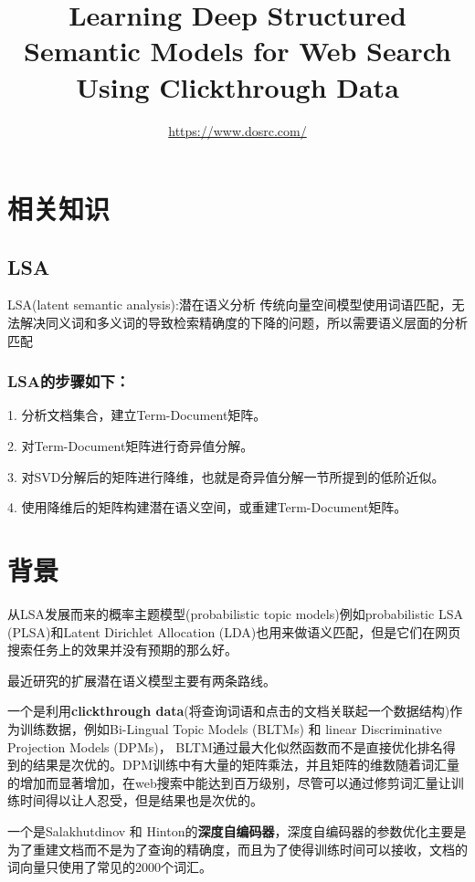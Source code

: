 \documentclass{article} %
\title{Learning Deep Structured Semantic Models for Web Search Using Clickthrough Data}
\author{
 \url{https://www.dosrc.com/}
}
\begin{document}
\begin{CJK*}{UTF8}{gkai}

\maketitle

\section{相关知识}
\subsection{LSA}
LSA(latent semantic analysis):潜在语义分析
传统向量空间模型使用词语匹配，无法解决同义词和多义词的导致检索精确度的下降的问题，所以需要语义层面的分析匹配

\subsubsection{LSA的步骤如下：}

1. 分析文档集合，建立Term-Document矩阵。

2. 对Term-Document矩阵进行奇异值分解。

3. 对SVD分解后的矩阵进行降维，也就是奇异值分解一节所提到的低阶近似。

4. 使用降维后的矩阵构建潜在语义空间，或重建Term-Document矩阵。


\section{背景}
从LSA发展而来的概率主题模型(probabilistic topic models)例如probabilistic LSA (PLSA)和Latent Dirichlet Allocation (LDA)也用来做语义匹配，但是它们在网页搜索任务上的效果并没有预期的那么好。

最近研究的扩展潜在语义模型主要有两条路线。

一个是利用\textbf{clickthrough data}(将查询词语和点击的文档关联起一个数据结构)作为训练数据，例如Bi-Lingual Topic Models (BLTMs) 和 linear Discriminative Projection Models (DPMs)，
BLTM通过最大化似然函数而不是直接优化排名得到的结果是次优的。DPM训练中有大量的矩阵乘法，并且矩阵的维数随着词汇量的增加而显著增加，在web搜索中能达到百万级别，尽管可以通过修剪词汇量让训练时间得以让人忍受，但是结果也是次优的。

一个是Salakhutdinov 和 Hinton的\textbf{深度自编码器}，深度自编码器的参数优化主要是为了重建文档而不是为了查询的精确度，而且为了使得训练时间可以接收，文档的词向量只使用了常见的2000个词汇。


\end{CJK*}
\end{document}
